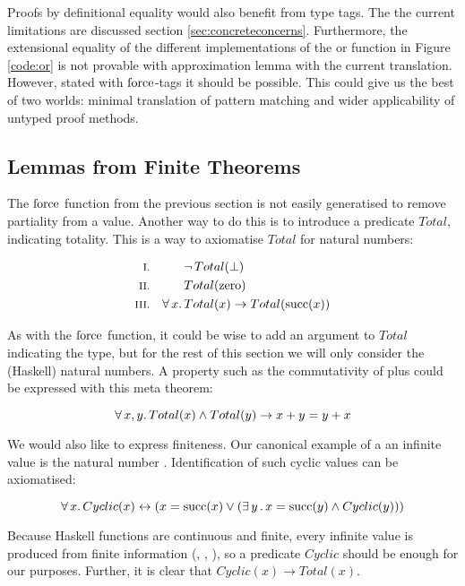 Proofs by definitional equality would also benefit from type tags. The
the current limitations are discussed section
\ref{sec:concreteconcerns}. Furthermore, the extensional equality of
the different implementations of the or function in Figure
\ref{code:or} is not provable with approximation lemma with the
current translation. However, stated with $\mathrm{force}$-tags it should
be possible. This could give us the best of two worlds: minimal
translation of pattern matching and wider applicability of untyped
proof methods.

\subsection{Lemmas from Finite Theorems}

The $\mathrm{force}$ function from the previous section is not easily
generatised to remove partiality from a value. Another way to do this
is to introduce a predicate $Total$, indicating totality. This is a
way to axiomatise $Total$ for natural numbers:

\begin{align*}
\rom{1} &&        & \neg \, Total(\bot) \\
\rom{2} &&        & Total(\fn{zero}) \\
\rom{3} && \fa{x} & Total(x) \rightarrow Total(\fn{succ}(x))
\end{align*}

As with the $\mathrm{force}$ function, it could be wise to add an argument
to $Total$ indicating the type, but for the rest of this section we
will only consider the (Haskell) natural numbers. A property such as the
commutativity of plus could be expressed with this meta theorem:

\begin{equation*}
\forall \, x , y . \, Total(x) \wedge Total(y) \rightarrow x + y = y + x
\end{equation*}

We would also like to express finiteness. Our canonical example of a
an infinite value is the natural number
. Identification of such cyclic values can be axiomatised:

\begin{equation*}
\forall \, x . \, Cyclic(x) \leftrightarrow (x = \mathrm{succ}(x) \vee (\exists \, y \, . \, x = \mathrm{succ}(y) \wedge Cyclic(y))) \\
\end{equation*}

Because Haskell functions are continuous and finite, every infinite
value is produced from finite information (, ,
), so a predicate $Cyclic$ should be enough for our
purposes. Further, it is clear that $Cyclic(x) \rightarrow Total(x)$.

